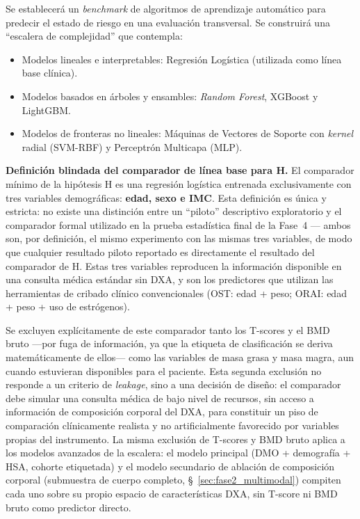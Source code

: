 \documentclass[../tesis.tex]{subfiles}
\begin{document}
Se establecerá un \textit{benchmark} de algoritmos de aprendizaje automático para predecir el estado de riesgo en una evaluación transversal. Se construirá una ``escalera de complejidad'' que contempla:
\begin{itemize}
    \item Modelos lineales e interpretables: Regresión Logística (utilizada como línea base clínica).
    \item Modelos basados en árboles y ensambles: \textit{Random Forest}, XGBoost y LightGBM.
    \item Modelos de fronteras no lineales: Máquinas de Vectores de Soporte con \textit{kernel} radial (SVM-RBF) y Perceptrón Multicapa (MLP).
\end{itemize}

\textbf{Definición blindada del comparador de línea base para H.} El comparador mínimo de la hipótesis H es una regresión logística entrenada exclusivamente con tres variables demográficas: \textbf{edad, sexo e IMC}. Esta definición es única y estricta: no existe una distinción entre un ``piloto'' descriptivo exploratorio y el comparador formal utilizado en la prueba estadística final de la Fase~4 --- ambos son, por definición, el mismo experimento con las mismas tres variables, de modo que cualquier resultado piloto reportado es directamente el resultado del comparador de H. Estas tres variables reproducen la información disponible en una consulta médica estándar sin DXA, y son los predictores que utilizan las herramientas de cribado clínico convencionales (OST: edad + peso; ORAI: edad + peso + uso de estrógenos).

Se excluyen explícitamente de este comparador tanto los T-scores y el BMD bruto ---por fuga de información, ya que la etiqueta de clasificación se deriva matemáticamente de ellos--- como las variables de masa grasa y masa magra, aun cuando estuvieran disponibles para el paciente. Esta segunda exclusión no responde a un criterio de \textit{leakage}, sino a una decisión de diseño: el comparador debe simular una consulta médica de bajo nivel de recursos, sin acceso a información de composición corporal del DXA, para constituir un piso de comparación clínicamente realista y no artificialmente favorecido por variables propias del instrumento. La misma exclusión de T-scores y BMD bruto aplica a los modelos avanzados de la escalera: el modelo principal (DMO + demografía + HSA, cohorte etiquetada) y el modelo secundario de ablación de composición corporal (submuestra de cuerpo completo, §~\ref{sec:fase2_multimodal}) compiten cada uno sobre su propio espacio de características DXA, sin T-score ni BMD bruto como predictor directo.
\end{document}
